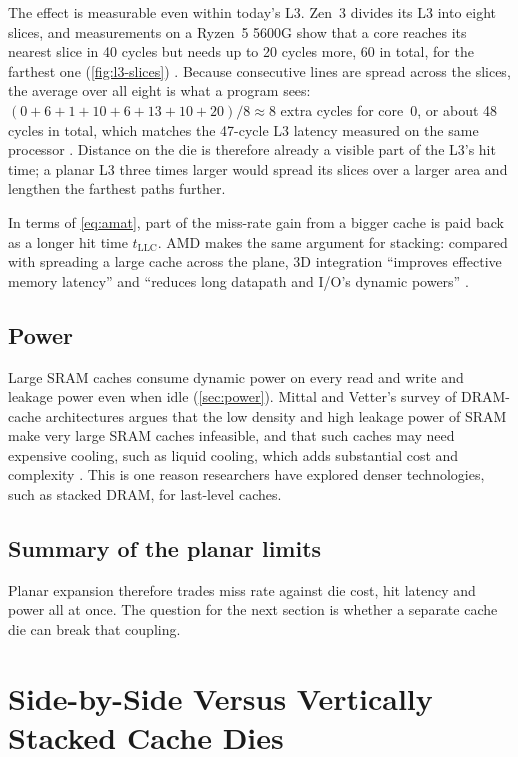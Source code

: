 The effect is measurable even within today's L3. Zen~3 divides its L3 into eight slices, and measurements on a Ryzen~5 5600G show that a core reaches its nearest slice in 40 cycles but needs up to 20 cycles more, 60 in total, for the farthest one (\cref{fig:l3-slices}) \cite{7-cpu.comAMDZen3}. Because consecutive lines are spread across the slices, the average over all eight is what a program sees: $(0+6+1+10+6+13+10+20)/8 \approx 8$ extra cycles for core~0, or about 48 cycles in total, which matches the 47-cycle L3 latency measured on the same processor \cite{7-cpu.comAMDZen3}. Distance on the die is therefore already a visible part of the L3's hit time; a planar L3 three times larger would spread its slices over a larger area and lengthen the farthest paths further.



 In terms of \cref{eq:amat}, part of the miss-rate gain from a bigger cache is paid back as a longer hit time $t_{\mathrm{LLC}}$. AMD makes the same argument for stacking: compared with spreading a large cache across the plane, 3D integration ``improves effective memory latency'' and ``reduces long datapath and I/O's dynamic powers'' \cite[slide~7]{wuu2022vcache}.

\subsection{Power}
Large SRAM caches consume dynamic power on every read and write and leakage power even when idle (\cref{sec:power}). Mittal and Vetter's survey of DRAM-cache architectures argues that the low density and high leakage power of SRAM make very large SRAM caches infeasible, and that such caches may need expensive cooling, such as liquid cooling, which adds substantial cost and complexity \cite[sec.~1]{mittalSurveyTechniquesArchitecting2016}. This is one reason researchers have explored denser technologies, such as stacked DRAM, for last-level caches.

\subsection{Summary of the planar limits}
Planar expansion therefore trades miss rate against die cost, hit latency and power all at once. The question for the next section is whether a separate cache die can break that coupling.

\section{Side-by-Side Versus Vertically Stacked Cache Dies}
\label{sec:horizontal-vs-vertical}

